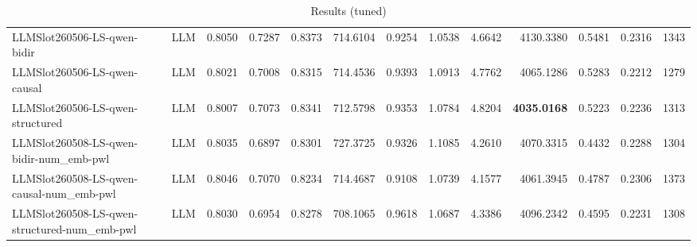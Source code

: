 \begin{table}[htbp]
{\begin{tabular}{ll|rrrrrrrrrr|r}
LLMSlot260506-LS-qwen-bidir & LLM & 0.8050 & 0.7287 & 0.8373 & 714.6104 & 0.9254 & 1.0538 & 4.6642 & 4130.3380 & 0.5481 & 0.2316 & 1343 \\
LLMSlot260506-LS-qwen-causal & LLM & 0.8021 & 0.7008 & 0.8315 & 714.4536 & 0.9393 & 1.0913 & 4.7762 & 4065.1286 & 0.5283 & 0.2212 & 1279 \\
LLMSlot260506-LS-qwen-structured & LLM & 0.8007 & 0.7073 & 0.8341 & 712.5798 & 0.9353 & 1.0784 & 4.8204 & \textbf{4035.0168} & 0.5223 & 0.2236 & 1313 \\
LLMSlot260508-LS-qwen-bidir-num\_emb-pwl & LLM & 0.8035 & 0.6897 & 0.8301 & 727.3725 & 0.9326 & 1.1085 & 4.2610 & 4070.3315 & 0.4432 & 0.2288 & 1304 \\
LLMSlot260508-LS-qwen-causal-num\_emb-pwl & LLM & 0.8046 & 0.7070 & 0.8234 & 714.4687 & 0.9108 & 1.0739 & 4.1577 & 4061.3945 & 0.4787 & 0.2306 & 1373 \\
LLMSlot260508-LS-qwen-structured-num\_emb-pwl & LLM & 0.8030 & 0.6954 & 0.8278 & 708.1065 & 0.9618 & 1.0687 & 4.3386 & 4096.2342 & 0.4595 & 0.2231 & 1308 \\
\bottomrule
\end{tabular}
}
\caption{Results (tuned)}
\label{tab:results_tuned}
\end{table}